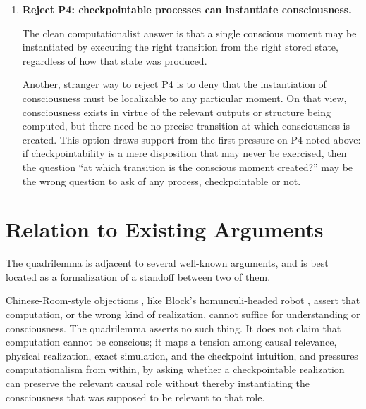 \documentclass[11pt]{article}
\begin{document}
\begin{enumerate}[label=\textbf{\arabic*.}]
        Penrose-style views in which consciousness depends on quantum effects
        \cite{penrose1994} may likewise be understood as taking a version of
        this route, if the relevant physical dynamics cannot be captured by an
        exact checkpointable simulation: for example, because consciousness is
        held to depend on delicate quantum superpositions, collapse-sensitive
        dynamics, or other nonclassical physical structure in the brain that
        cannot be replaced by saving, copying, and restoring an ordinary
        computational state.

  \item \textbf{Reject P4: checkpointable processes can instantiate
          consciousness.}

        The clean computationalist answer is that a single conscious moment may
        be instantiated by executing the right transition from the right stored
        state, regardless of how that state was produced.

        Another, stranger way to reject P4 is to deny that the instantiation of
        consciousness must be localizable to any particular moment. On that
        view, consciousness exists in virtue of the relevant outputs or
        structure being computed, but there need be no precise transition at
        which consciousness is created. This option draws support from the
        first pressure on P4 noted above: if checkpointability is a mere
        disposition that may never be exercised, then the question ``at which
        transition is the conscious moment created?'' may be the wrong question
        to ask of any process, checkpointable or not.
\end{enumerate}

\section{Relation to Existing Arguments}

The quadrilemma is adjacent to several well-known arguments, and is best
located as a formalization of a standoff between two of them.

Chinese-Room-style objections \cite{searle1980}, like Block's homunculi-headed
robot \cite{block1978}, assert that computation, or the wrong kind of
realization, cannot suffice for understanding or consciousness. The
quadrilemma asserts no such thing. It does not claim that computation cannot
be conscious; it maps a tension among causal relevance, physical realization,
exact simulation, and the checkpoint intuition, and pressures computationalism
from within, by asking whether a checkpointable realization can preserve the
relevant causal role without thereby instantiating the consciousness that was
supposed to be relevant to that role.
\end{document}
